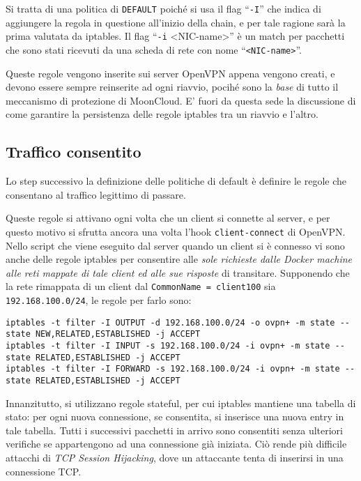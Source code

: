 		Si tratta di una politica di \texttt{DEFAULT} poiché si usa il flag ``\texttt{-I}''
		che indica di aggiungere la regola in questione all'inizio della chain, e per tale
		ragione sarà la prima valutata da iptables. Il flag ``\texttt{-i} <NIC-name>'' è un match
		per pacchetti che sono stati ricevuti da una scheda di rete con nome ``\texttt{<NIC-name>}''.
				
				
		Queste regole vengono inserite sui server OpenVPN appena vengono creati, e
		devono essere sempre reinserite ad ogni riavvio, pocihé sono la \textit{base}
		di tutto il meccanismo di protezione di MoonCloud. E' fuori da questa sede la discussione
		di come garantire la persistenza delle regole iptables tra un riavvio e l'altro.
				
				
		\subsection{Traffico consentito}
		Lo step successivo la definizione delle politiche di default è definire le regole che
		consentano al traffico legittimo di passare.
				
		Queste regole si attivano ogni volta che un client si connette al server, e per
		questo motivo si sfrutta ancora una volta l'hook \texttt{client-connect} di OpenVPN.
		Nello script che viene eseguito dal server quando un client si è connesso vi sono
		anche delle regole iptables per consentire alle \textit{sole richieste
		dalle Docker machine alle reti mappate di tale client ed alle sue risposte}
		di transitare.
		Supponendo che la rete rimappata di un client dal \texttt{CommonName = client100} sia
		\texttt{192.168.100.0/24}, le regole per farlo sono:
		\begin{verbatim}
iptables -t filter -I OUTPUT -d 192.168.100.0/24 -o ovpn+ -m state --state NEW,RELATED,ESTABLISHED -j ACCEPT
iptables -t filter -I INPUT -s 192.168.100.0/24 -i ovpn+ -m state --state RELATED,ESTABLISHED -j ACCEPT
iptables -t filter -I FORWARD -s 192.168.100.0/24 -i ovpn+ -m state --state RELATED,ESTABLISHED -j ACCEPT
		\end{verbatim}
				
		Innanzitutto, si utilizzano regole stateful, per cui iptables mantiene
		una tabella di stato: per ogni nuova connessione, se consentita, si inserisce
		una nuova entry in tale tabella. Tutti i successivi pacchetti in arrivo sono consentiti
		senza ulteriori verifiche
		se appartengono ad una connessione già iniziata.
		Ciò rende più difficile
		attacchi di \textit{TCP Session Hijacking}, dove un attaccante tenta di inserirsi in
		una connessione TCP.
				
